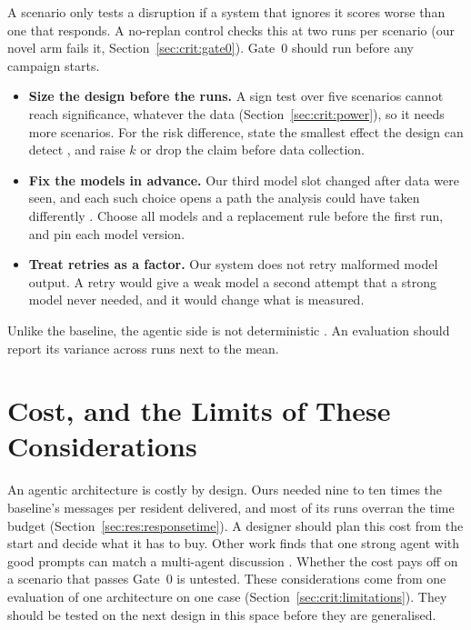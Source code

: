 A scenario only tests a disruption if a system that ignores it scores worse
than one that responds. A no-replan control \parencite{lipsitch2010}
checks this at two runs per scenario (our novel arm fails it,
Section~\ref{sec:crit:gate0}). Gate~0 should run before any campaign starts.

\begin{itemize}
\item \textbf{Size the design before the runs.} A sign test over five
  scenarios cannot reach significance, whatever the data
  (Section~\ref{sec:crit:power}), so it needs more scenarios. For the risk difference, state the smallest effect the design can
  detect \parencite{cohen1988}, and raise $k$ or drop the claim before data
  collection.
\item \textbf{Fix the models in advance.} Our third model slot changed after
  data were seen, and each such choice opens a path the analysis could have
  taken differently \parencite{gelman2014}. Choose all models and a
  replacement rule before the first run, and pin each model version.
\item \textbf{Treat retries as a factor.} Our system does not retry malformed
  model output. A retry would give a weak model a second attempt that a strong
  model never needed, and it would change what is measured.
\end{itemize}

Unlike the baseline, the agentic side is not deterministic
\parencite{yuan2025}. An evaluation should report its variance across runs next
to the mean.

\section{Cost, and the Limits of These Considerations}
\label{sec:design:cost}
\label{sec:design:scope}

An agentic architecture is costly by design. Ours needed nine to ten
times the baseline's messages per resident delivered, and most of its runs
overran the time budget (Section~\ref{sec:res:responsetime}).
A designer should plan this cost from the start and decide what it has to buy.
Other work finds that one strong agent with good prompts can match a
multi-agent discussion \parencite{wang2024}. Whether the cost pays off on a
scenario that passes Gate~0 is untested. These considerations come from one evaluation of one architecture on one case
(Section~\ref{sec:crit:limitations}). They should be tested on the next design
in this space before they are generalised.
